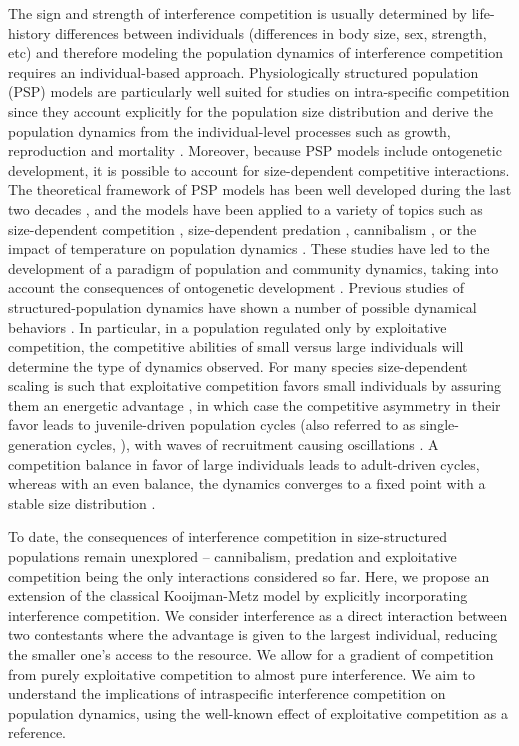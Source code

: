 The sign and strength of interference competition is usually determined by
life-history differences between individuals (differences in body size, sex,
strength, etc) and therefore modeling the population dynamics of interference
competition requires an individual-based approach. Physiologically structured
population (PSP) models are particularly well suited for studies on
intra-specific competition since they account explicitly for the population size
distribution and derive the population dynamics from the individual-level
processes such as growth, reproduction and mortality
\autocites{kooijman1984a,metz1986a,de-roos1997a}. Moreover, because PSP models
include ontogenetic development, it is possible to account for size-dependent
competitive interactions. The theoretical framework of PSP models has been well
developed during the last two decades
\autocites{de-roos1992a,de-roos1997a,persson1998a,de-roos2001a,diekmann2001a,
diekmann2007a,de-roos2012a}, and the models have been applied to a variety of
topics such as size-dependent competition \autocites{persson1998a},
size-dependent predation \autocites{wolfshaar2006a}, cannibalism
\autocites{claessen2000a,claessen2004a}, or the impact of temperature on
population dynamics \autocites{ohlberger2011a}.
These studies have led to the development of a paradigm of population and
community dynamics, taking into account the consequences of ontogenetic
development \autocites{de-roos2012a}. Previous studies of structured-population
dynamics have shown a number of possible dynamical behaviors
\autocites{de-roos2003a,de-roos2003b}. In particular, in a population regulated
only by exploitative competition, the competitive abilities of small versus
large individuals will determine the type of dynamics observed. For many species
size-dependent scaling is such that exploitative competition favors small
individuals by assuring them an energetic advantage
\autocites{persson1998a,persson2006a}, in which case the competitive asymmetry in
their favor leads to juvenile-driven population cycles (also referred to as
single-generation cycles, \textcite{murdoch2002a}), with waves of recruitment
causing oscillations \autocites{de-roos2003a,de-roos2003b}. A competition balance
in favor of large individuals leads to adult-driven cycles, whereas with an even
balance, the dynamics converges to a fixed point with a stable size distribution
\autocites{de-roos2003a,de-roos2003b}.

To date, the consequences of interference competition in size-structured
populations remain unexplored – cannibalism, predation and exploitative
competition being the only interactions considered so far. Here, we propose an
extension of the classical Kooijman-Metz model
\autocites{kooijman1984a,de-roos1997a} by explicitly incorporating interference
competition. We consider interference as a direct interaction between two
contestants where the advantage is given to the largest individual, reducing the
smaller one's access to the resource. We allow for a gradient of competition
from purely exploitative competition to almost pure interference. We aim to
understand the implications of intraspecific interference competition on
population dynamics, using the well-known effect of exploitative competition as
a reference.

